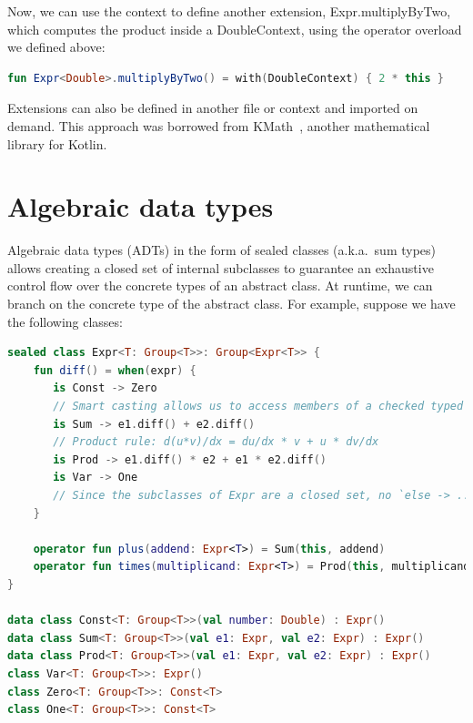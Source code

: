 \documentclass[12pt,initial,twoside,maitrise]{dms}
\numberwithin{equation}{section}
\numberwithin{table}{chapter}
\numberwithin{figure}{chapter}
\begin{document}
Now, we can use the context to define another extension, Expr.multiplyByTwo, which computes the product inside a DoubleContext, using the operator overload we defined above:

\begin{lstlisting}[caption={Simple code listing.}, language=Kotlin]
fun Expr<Double>.multiplyByTwo() = with(DoubleContext) { 2 * this }
\end{lstlisting}

Extensions can also be defined in another file or context and imported on demand. This approach was borrowed from KMath~\cite{nozik2019acat}, another mathematical library for Kotlin.

\section{Algebraic data types}\label{sec:adts}

Algebraic data types (ADTs) in the form of sealed classes (a.k.a.\ sum types) allows creating a closed set of internal subclasses to guarantee an exhaustive control flow over the concrete types of an abstract class. At runtime, we can branch on the concrete type of the abstract class. For example, suppose we have the following classes:

\begin{lstlisting}[caption={Users must handle all subclasses when branching on the type of a sealed class, as incomplete control flow will not compile (instead of failing silently at runtime).}, language=Kotlin]
sealed class Expr<T: Group<T>>: Group<Expr<T>> {
    fun diff() = when(expr) {
       is Const -> Zero
       // Smart casting allows us to access members of a checked typed without explicit casting
       is Sum -> e1.diff() + e2.diff()
       // Product rule: d(u*v)/dx = du/dx * v + u * dv/dx
       is Prod -> e1.diff() * e2 + e1 * e2.diff()
       is Var -> One
       // Since the subclasses of Expr are a closed set, no `else -> ...` is required.
    }

    operator fun plus(addend: Expr<T>) = Sum(this, addend)
    operator fun times(multiplicand: Expr<T>) = Prod(this, multiplicand)
}

data class Const<T: Group<T>>(val number: Double) : Expr()
data class Sum<T: Group<T>>(val e1: Expr, val e2: Expr) : Expr()
data class Prod<T: Group<T>>(val e1: Expr, val e2: Expr) : Expr()
class Var<T: Group<T>>: Expr()
class Zero<T: Group<T>>: Const<T>
class One<T: Group<T>>: Const<T>
\end{lstlisting}
\end{document}
